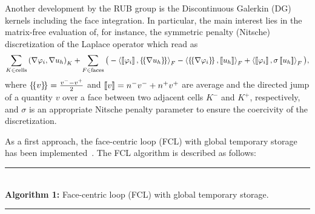 \documentclass[a4paper,12pt]{article}
\begin{document}
Another development by the RUB group is the Discontinuous Galerkin (DG) kernels including the face integration. In particular, the main interest lies in the matrix-free evaluation of, for instance,  the symmetric penalty (Nitsche) discretization of the Laplace operator which read as
\[
    \sum\limits_{K \in \text{cells}} \left(\nabla \varphi_i, \nabla u_h \right)_{K} + \sum\limits_{F \in \text{faces}} \big( -\left< \jump{\varphi_i}, \average{\nabla u_h} \right>_{F} - \left< \average{\nabla \varphi_i}, \jump{u_h}\right>_F  + \left< \jump{\varphi_i}, \sigma \jump{u_h}\right>_F \big),
\]
where $\left\{\!\left\{v\right\}\!\right\} = \frac{v^{-}-v^{+}}{2}$ and $\left[\!\left[{v}\right]\!\right] = n^{-}v^{-}+n^{+}v^{+}$ are average and the directed jump of a quantity $v$ over a face between two adjacent cells $K^{-}$ and $K^{+}$, respectively, and $\sigma$ is an appropriate Nitsche penalty parameter to ensure the coercivity of the discretization.



As a first approach, the face-centric loop (FCL) with global temporary storage has been implemented~\cite{KronbichlerAllalen2018, KronbichlerKormann2019}. The FCL algorithm is described as follows:

\noindent\rule{\textwidth}{1pt}\\[-0.5em]
\textbf{Algorithm 1:} Face-centric loop (FCL) with global temporary storage.\\[-0.5em]
\rule{\textwidth}{0.6pt}
\end{document}
